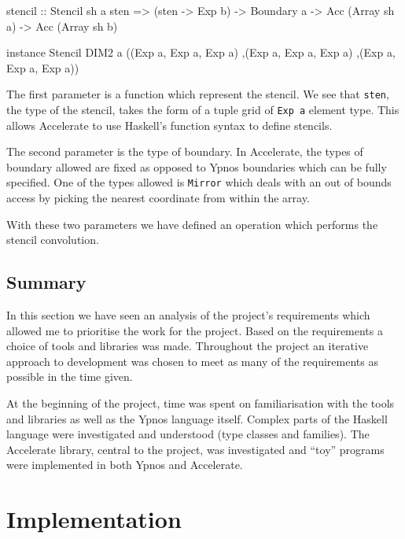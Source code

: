 \documentclass[12pt,a4paper,twoside]{scrbook}
\begin{document}

\begin{hflisting}[label={lst:sten}, caption={The type of the stencil application
  function in Accelerate. I have also included an example instance of the
  \texttt{Stencil} type class. Many others are also possible.}]
stencil :: Stencil sh a sten =>
           (sten -> Exp b) ->
           Boundary a ->
           Acc (Array sh a) ->
           Acc (Array sh b)

instance Stencil DIM2 a ((Exp a, Exp a, Exp a)
                        ,(Exp a, Exp a, Exp a)
                        ,(Exp a, Exp a, Exp a))
\end{hflisting}

The first parameter is a function which represent the stencil. We see that
\texttt{sten}, the type of the stencil, takes the form of a tuple grid of
\texttt{Exp a} element type. This allows Accelerate to use Haskell's function
syntax to define stencils.

The second parameter is the type of boundary. In Accelerate, the types of
boundary allowed are fixed as opposed to Ypnos boundaries which can be fully
specified. One of the types allowed is \texttt{Mirror} which deals with an out
of bounds access by picking the nearest coordinate from within the array.

With these two parameters we have defined an operation which performs the
stencil convolution.


\section{Summary}

In this section we have seen an analysis of the project's requirements which
allowed me to prioritise the work for the project. Based on the requirements a
choice of tools and libraries was made. Throughout the project an iterative
approach to development was chosen to meet as many of the requirements as
possible in the time given.

At the beginning of the project, time was spent on familiarisation with the
tools and libraries as well as the Ypnos language itself. Complex parts of the
Haskell language were investigated and understood (type classes and
families). The Accelerate library, central to the project, was investigated and
``toy'' programs were implemented in both Ypnos and Accelerate.

\chapter{Implementation}
\label{sec:impl}
\end{document}
